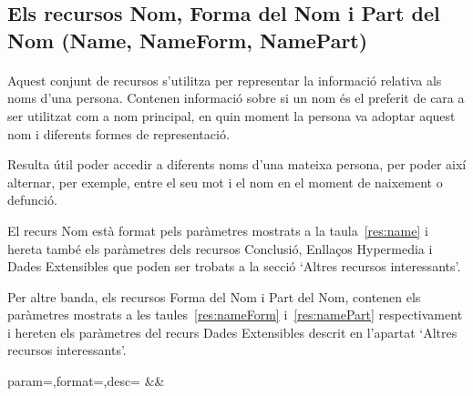 \subsection{Els recursos Nom, Forma del Nom i Part del Nom (Name, NameForm, NamePart)}

    \paragraph{}
    Aquest conjunt de recursos s'utilitza per representar la informació relativa als noms d'una persona.  Contenen informació sobre si un nom és el preferit de cara a ser utilitzat com a nom principal, en quin moment la persona va adoptar aquest nom i diferents formes de representació.

    Resulta útil poder accedir a diferents noms d'una mateixa persona, per poder així alternar, per exemple, entre el seu mot i el nom en el moment de naixement o defunció.

    El recurs Nom està format pels paràmetres mostrats a la taula~\ref{res:name} i hereta també els paràmetres dels recursos Conclusió, Enllaços Hypermedia i Dades Extensibles que poden ser trobats a la secció `Altres recursos interessants'.

    Per altre banda, els recursos Forma del Nom i Part del Nom, contenen els paràmetres mostrats a les taules~\ref{res:nameForm} i~\ref{res:namePart} respectivament i hereten els paràmetres del recurs Dades Extensibles descrit en l'apartat `Altres recursos interessants'.

    \begin{center}
             {param=\param,format=\format,desc=\desc}
             {\param&\format&\desc}
     \end{center}


